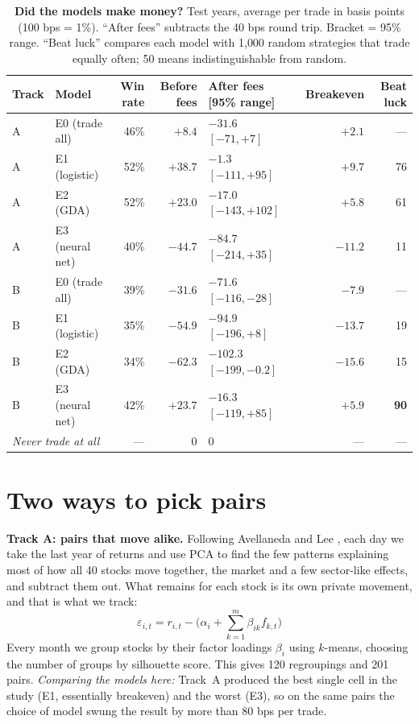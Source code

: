 \documentclass[10pt]{article}
\begin{document}
\begin{table}[!ht]
\centering
\small
\caption{\textbf{Did the models make money?} Test years, average per trade in
basis points (100 bps = 1\%). ``After fees'' subtracts the 40 bps round trip.
Bracket = 95\% range. ``Beat luck'' compares each model with 1{,}000 random
strategies that trade equally often; 50 means indistinguishable from random.}
\label{tab:money}
\begin{tabular}{llrrlrr}
\toprule
Track & Model & Win rate & Before fees & After fees [95\% range] & Breakeven & Beat luck \\
\midrule
A & E0 (trade all) & 46\% & $+8.4$ & $-31.6$ \ $[-71, +7]$ & $+2.1$ & --- \\
A & E1 (logistic) & 52\% & $\mathbf{+38.7}$ & $\mathbf{-1.3}$ \ $[-111, +95]$ & $\mathbf{+9.7}$ & 76 \\
A & E2 (GDA) & 52\% & $+23.0$ & $-17.0$ \ $[-143, +102]$ & $+5.8$ & 61 \\
A & E3 (neural net) & 40\% & $-44.7$ & $-84.7$ \ $[-214, +35]$ & $-11.2$ & 11 \\
\midrule
B & E0 (trade all) & 39\% & $-31.6$ & $-71.6$ \ $[-116, -28]$ & $-7.9$ & --- \\
B & E1 (logistic) & 35\% & $-54.9$ & $-94.9$ \ $[-196, +8]$ & $-13.7$ & 19 \\
B & E2 (GDA) & 34\% & $-62.3$ & $-102.3$ \ $[-199, -0.2]$ & $-15.6$ & 15 \\
B & E3 (neural net) & 42\% & $+23.7$ & $-16.3$ \ $[-119, +85]$ & $+5.9$ & \textbf{90} \\
\midrule
\multicolumn{2}{l}{\emph{Never trade at all}} & --- & $0$ & $0$ & --- & --- \\
\bottomrule
\end{tabular}
\end{table}

\section{Two ways to pick pairs}

\textbf{Track A: pairs that move alike.} Following Avellaneda and Lee
\cite{avellaneda2010}, each day we take the last year of returns and use PCA to
find the few patterns explaining most of how all 40 stocks move together, the
market and a few sector-like effects, and subtract them out. What remains for
each stock is its own private movement, and that is what we track:
\begin{equation}
\varepsilon_{i,t} = r_{i,t} - \Big(\alpha_i + \textstyle\sum_{k=1}^{m}\beta_{ik} f_{k,t}\Big)
\end{equation}
Every month we group stocks by their factor loadings $\beta_i$ using $k$-means,
choosing the number of groups by silhouette score. This gives 120 regroupings and
201 pairs. \emph{Comparing the models here:} Track~A produced the best single
cell in the study (E1, essentially breakeven) and the worst (E3), so on the same
pairs the choice of model swung the result by more than 80 bps per trade.
\end{document}
